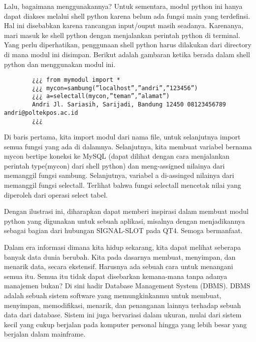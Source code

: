 Lalu, bagaimana menggunakannya? Untuk sementara, modul python ini hanya dapat diakses melalui shell python karena belum ada fungsi main yang terdefinsi. Hal ini disebabkan karena rancangan input/ouput masih seadanya. Karenanya, mari masuk ke shell python dengan menjalankan perintah python di terminal. Yang perlu diperhatikan, penggunaan shell python harus dilakukan dari directory di mana modul ini disimpan. Berikut adalah gambaran ketika berada dalam shell python dan menggunakan modul ini. 

	\begin{verbatim}
		¿¿¿ from mymodul import * 
		¿¿¿ mycon=sambung(”localhost”,”andri”,”123456”) 
		¿¿¿ a=selectall(mycon,”teman”,”alamat”) 
		Andri Jl. Sariasih, Sarijadi, Bandung 12450 08123456789 andri@poltekpos.ac.id 
		¿¿¿ 
	\end{verbatim}
	
Di baris pertama, kita import modul dari nama file, untuk selanjutnya import semua fungsi yang ada di dalamnya. Selanjutnya, kita membuat variabel bernama mycon bertipe koneksi ke MySQL (dapat dilihat dengan cara menjalankan perintah type(mycon) dari shell python) dan meng-assigned nilainya dari memanggil fungsi sambung. Selanjutnya, variabel a di-assinged nilainya dari memanggil fungsi selectall. Terlihat bahwa fungsi selectall mencetak nilai yang diperoleh dari operasi select tabel. 

Dengan ilustrasi ini, diharapkan dapat memberi inspirasi dalam membuat modul python yang digunakan untuk sebuah aplikasi, misalnya dengan menjadikannya sebagai bagian dari hubungan SIGNAL-SLOT pada QT4. Semoga bermanfaat. 

Dalam era informasi dimana kita hidup sekarang, kita dapat melihat seberapa banyak data dunia berubah. Kita pada dasarnya membuat, menyimpan, dan menarik data, secara ekstensif. Harusnya ada sebuah cara untuk menangani semua itu. Semua itu tidak dapat disebarkan kemana-mana tanpa adanya manajemen bukan? Di sini hadir Database Management System (DBMS). DBMS adalah sebuah sistem software yang memungkinkanmu untuk membuat, menyimpan, memodifikasi, menarik, dan penanganan lainnya terhadap sebuah data dari database. Sistem ini juga bervariasi dalam ukuran, mulai dari sistem kecil yang cukup berjalan pada komputer personal hingga yang lebih besar yang berjalan dalam mainframe. 

